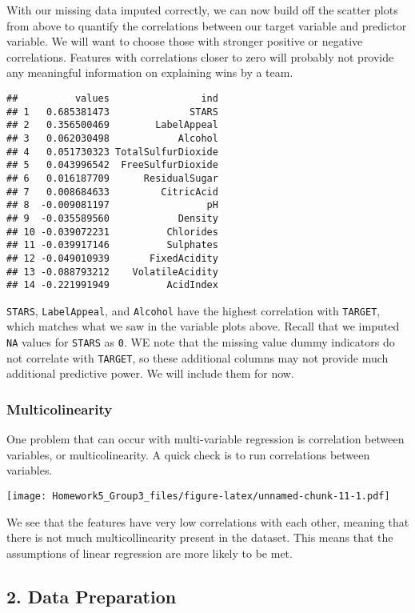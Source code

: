 \documentclass[
]{article}
\begin{document}
With our missing data imputed correctly, we can now build off the
scatter plots from above to quantify the correlations between our target
variable and predictor variable. We will want to choose those with
stronger positive or negative correlations. Features with correlations
closer to zero will probably not provide any meaningful information on
explaining wins by a team.

\begin{verbatim}
##          values                ind
## 1   0.685381473              STARS
## 2   0.356500469        LabelAppeal
## 3   0.062030498            Alcohol
## 4   0.051730323 TotalSulfurDioxide
## 5   0.043996542  FreeSulfurDioxide
## 6   0.016187709      ResidualSugar
## 7   0.008684633         CitricAcid
## 8  -0.009081197                 pH
## 9  -0.035589560            Density
## 10 -0.039072231          Chlorides
## 11 -0.039917146          Sulphates
## 12 -0.049010939       FixedAcidity
## 13 -0.088793212    VolatileAcidity
## 14 -0.221991949          AcidIndex
\end{verbatim}

\texttt{STARS}, \texttt{LabelAppeal}, and \texttt{Alcohol} have the
highest correlation with \texttt{TARGET}, which matches what we saw in
the variable plots above. Recall that we imputed \texttt{NA} values for
\texttt{STARS} as \texttt{0}. WE note that the missing value dummy
indicators do not correlate with \texttt{TARGET}, so these additional
columns may not provide much additional predictive power. We will
include them for now.

\hypertarget{multicolinearity}{%
\subsubsection{Multicolinearity}\label{multicolinearity}}

One problem that can occur with multi-variable regression is correlation
between variables, or multicolinearity. A quick check is to run
correlations between variables.

\texttt{[image: Homework5\_Group3\_files/figure-latex/unnamed-chunk-11-1.pdf]}

We see that the features have very low correlations with each other,
meaning that there is not much multicollinearity present in the dataset.
This means that the assumptions of linear regression are more likely to
be met.

\hypertarget{data-preparation}{%
\subsection{2. Data Preparation}\label{data-preparation}}
\end{document}
